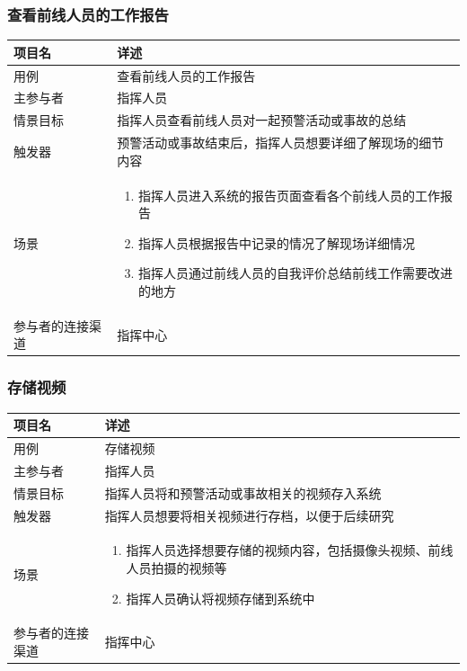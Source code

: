 \documentclass{ctexrep}
\begin{document}
\subsubsection{查看前线人员的工作报告}
\begin{longtable}{p{2cm} | p{10cm}}
\hline
项目名 & 详述 \\
\hline
\hline
用例 & 查看前线人员的工作报告\\
\hline
主参与者 & 指挥人员 \\
\hline
情景目标 &  指挥人员查看前线人员对一起预警活动或事故的总结\\
\hline
触发器 &  预警活动或事故结束后，指挥人员想要详细了解现场的细节内容\\
\hline
场景 & \begin{enumerate}
	\item 指挥人员进入系统的报告页面查看各个前线人员的工作报告
	\item 指挥人员根据报告中记录的情况了解现场详细情况
	\item 指挥人员通过前线人员的自我评价总结前线工作需要改进的地方
\end{enumerate} \\
\hline
参与者的连接渠道 & 指挥中心 \\
\hline
\end{longtable}

\subsubsection{存储视频}
\begin{longtable}{p{2cm} | p{10cm}}
\hline
项目名 & 详述 \\
\hline
\hline
用例 & 存储视频\\
\hline
主参与者 & 指挥人员 \\
\hline
情景目标 &  指挥人员将和预警活动或事故相关的视频存入系统\\
\hline
触发器 &  指挥人员想要将相关视频进行存档，以便于后续研究\\
\hline
场景 & \begin{enumerate}
	\item 指挥人员选择想要存储的视频内容，包括摄像头视频、前线人员拍摄的视频等
	\item 指挥人员确认将视频存储到系统中
\end{enumerate} \\
\hline
参与者的连接渠道 & 指挥中心 \\
\hline
\end{longtable}
\end{document}
